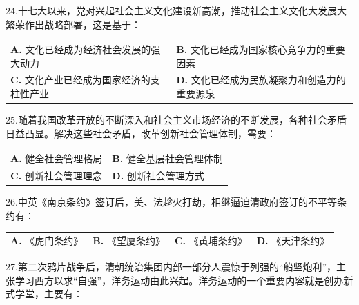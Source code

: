 \documentclass[UTF8,11pt]{ctexart}
\begin{document}
24.十七大以来，党对兴起社会主义文化建设新高潮，推动社会主义文化大发展大繁荣作出战略部署，这是基于：


\begin{center}\begin{tabular}{>{\raggedright\arraybackslash}p{\dimexpr(\linewidth-4\tabcolsep)/2\relax}>{\raggedright\arraybackslash}p{\dimexpr(\linewidth-4\tabcolsep)/2\relax}}
\textbf{A.} 文化已经成为经济社会发展的强大动力 & \textbf{B.} 文化已经成为国家核心竞争力的重要因素\\[.35em]
\textbf{C.} 文化产业已经成为国家经济的支柱性产业 & \textbf{D.} 文化已经成为民族凝聚力和创造力的重要源泉\\[.35em]\end{tabular}\end{center}

25.随着我国改革开放的不断深入和社会主义市场经济的不断发展，各种社会矛盾日益凸显。解决这些社会矛盾，改革创新社会管理体制，需要：


\begin{center}\begin{tabular}{>{\raggedright\arraybackslash}p{\dimexpr(\linewidth-4\tabcolsep)/2\relax}>{\raggedright\arraybackslash}p{\dimexpr(\linewidth-4\tabcolsep)/2\relax}}
\textbf{A.} 健全社会管理格局 & \textbf{B.} 健全基层社会管理体制\\[.35em]
\textbf{C.} 创新社会管理理念 & \textbf{D.} 创新社会管理方式\\[.35em]\end{tabular}\end{center}

26.中英《南京条约》签订后，美、法趁火打劫，相继逼迫清政府签订的不平等条约有：


\begin{center}\begin{tabular}{>{\raggedright\arraybackslash}p{\dimexpr(\linewidth-8\tabcolsep)/4\relax}>{\raggedright\arraybackslash}p{\dimexpr(\linewidth-8\tabcolsep)/4\relax}>{\raggedright\arraybackslash}p{\dimexpr(\linewidth-8\tabcolsep)/4\relax}>{\raggedright\arraybackslash}p{\dimexpr(\linewidth-8\tabcolsep)/4\relax}}
\textbf{A.} 《虎门条约》 & \textbf{B.} 《望厦条约》 & \textbf{C.} 《黄埔条约》 & \textbf{D.} 《天津条约》\\[.35em]\end{tabular}\end{center}

27.第二次鸦片战争后，清朝统治集团内部一部分人震惊于列强的“船坚炮利”，主张学习西方以求“自强”，洋务运动由此兴起。洋务运动的一个重要内容就是创办新式学堂，主要有：
\end{document}
